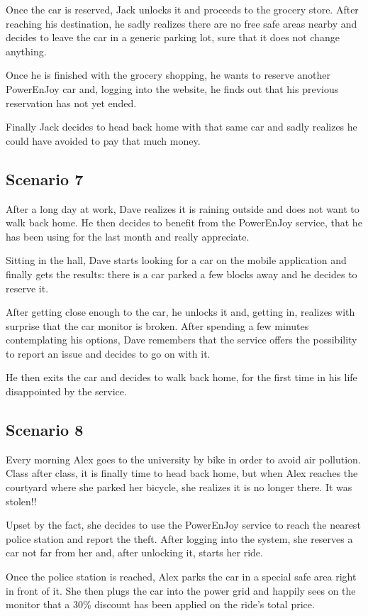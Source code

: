 Once the car is reserved, Jack unlocks it and proceeds to the grocery store. After reaching his destination, he sadly realizes there are no free safe areas nearby and decides to leave the car in a generic parking lot, sure that it does not change anything. 

Once he is finished with the grocery shopping, he wants to reserve another PowerEnJoy car and, logging into the website, he finds out that his previous reservation has not yet ended.  

Finally Jack decides to head back home with that same car and sadly realizes he could have avoided to pay that much money. 
\subsection{Scenario 7}
After a long day at work, Dave realizes it is raining outside and does not want to walk back home. He then decides to benefit from the PowerEnJoy service, that he has been using for the last month and really appreciate. 

Sitting in the hall, Dave starts looking for a car on the mobile application and finally gets the results: there is a car parked a few blocks away and he decides to reserve it. 

After getting close enough to the car, he unlocks it and, getting in, realizes with surprise that the car monitor is broken. After spending a few minutes contemplating his options, Dave remembers that the service offers the possibility to report an issue and decides to go on with it. 

He then exits the car and decides to walk back home, for the first time in his life disappointed by the service.
\subsection{Scenario 8}
Every morning Alex goes to the university by bike in order to avoid air pollution. Class after class, it is finally time to head back home, but when Alex reaches the courtyard where she parked her bicycle, she realizes it is no longer there. It was stolen!! 

Upset by the fact, she decides to use the PowerEnJoy service to reach the nearest police station and report the theft. After logging into the system, she reserves a car not far from her and, after unlocking it, starts her ride. 

Once the police station is reached, Alex parks the car in a special safe area right in front of it. She then plugs the car into the power grid and happily sees on the monitor that a 30\% discount has been applied on the ride's total price.